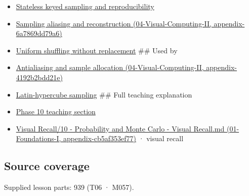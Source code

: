 \begin{itemize}
\item
  \hyperref[appendix-daaf25bfd3a0]{Stateless keyed sampling and reproducibility}
\item
  \href{../04-Visual-Computing-II/main.pdf\#nameddest=appendix-6a7869dd79a6}{Sampling aliasing and reconstruction (04-Visual-Computing-II, appendix-6a7869dd79a6)}
\item
  \hyperref[appendix-184fcc411663]{Uniform shuffling without replacement} \#\# Used by
\item
  \href{../04-Visual-Computing-II/main.pdf\#nameddest=appendix-4192b2bdd21e}{Antialiasing and sample allocation (04-Visual-Computing-II, appendix-4192b2bdd21e)}
\item
  \hyperref[appendix-1c5e85693a06]{Latin-hypercube sampling} \#\# Full teaching explanation
\item
  \hyperref[02-foundations-ii-ch029-a-computer-produces-deterministic-pseudorandom-sequences]{Phase 10 teaching section}
\item
  \href{../01-Foundations-I/main.pdf\#nameddest=appendix-cb5af353ef77}{Visual Recall/10 - Probability and Monte Carlo - Visual Recall.md (01-Foundations-I, appendix-cb5af353ef77)} · visual recall
\end{itemize}

\subsection{Source coverage}\label{appendix-9f693ffd82bc-source-coverage}

Supplied lesson parts: 939 (T06 · M057).
